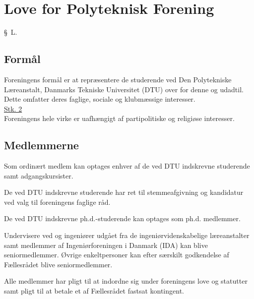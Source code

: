 \setcounter{section}{12}
\section*{Love for Polyteknisk Forening}
\begin{list}
{\S \ L.}{}
    \setlength{\labelwidth}{.5in}%
    \setlength{\leftmargin}{.25in} %




\subsection{Formål}\label{L:kap:Formaal}
\item Foreningens formål er at repræsentere de studerende ved Den Polytekniske Læreanstalt, Danmarks Tekniske Universitet (DTU) over for denne og udadtil. Dette omfatter deres faglige, sociale og klubmæssige interesser. \\

\underline{Stk. 2} \\
Foreningens hele virke er uafhængigt af partipolitiske og religiøse interesser.

\subsection{Medlemmerne}
\label{L:kap:medlemmerne}
\item Som ordinært medlem kan optages enhver af de ved DTU indskrevne studerende samt adgangskursister.
\item De ved DTU indskrevne studerende har ret til stemmeafgivning og kandidatur ved valg til foreningens faglige råd.
\item De ved DTU indskrevne ph.d.-studerende kan optages som ph.d. medlemmer.

\item Undervisere ved og ingeniører udgået fra de ingeniørvidenskabelige læreanstalter samt medlemmer af         Ingeniørforeningen i Danmark (IDA) kan blive seniormedlemmer. Øvrige enkeltpersoner kan efter særskilt godkendelse af Fællesrådet blive seniormedlemmer.
\item \label{L:Medlem:Pligt} Alle medlemmer har pligt til at indordne sig under foreningens love og statutter samt pligt til at betale et af Fællesrådet fastsat kontingent.\\


\end{list}
